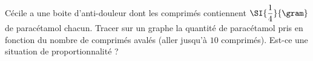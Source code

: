
\begin{exercice}\label{exo2smath-0032}

    Cécile a une boite d'anti-douleur dont les comprimés contiennent \( \SI{\dfrac{ 1 }{ 4 }}{\gram}\) de paracétamol chacun. Tracer sur un graphe la quantité de paracétamol pris en fonction du nombre de comprimés avalés (aller jusqu'à \( 10\) comprimés). Est-ce une situation de proportionnalité ?

\end{exercice}
